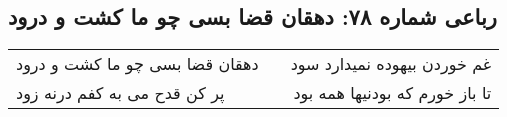 \begin{center}
\section*{رباعی شماره ۷۸: دهقان قضا بسی چو ما کشت و درود}
\label{sec:sh078}
\begin{longtable}{l p{0.5cm} r}
دهقان قضا بسی چو ما کشت و درود
&&
غم خوردن بیهوده نمیدارد سود
\\
پر کن قدح می به کفم درنه زود
&&
تا باز خورم که بودنیها همه بود
\\
\end{longtable}
\end{center}
